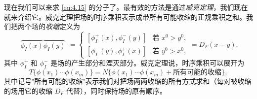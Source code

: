 现在我们可以来求 \eqref{eq:4.15} 的分子了。最有效的方法是通过\emph{威克定理}，我们现在就来介绍它。威克定理把场的时序乘积表示成带所有可能收缩的正规乘积之和。我们把两个场的\emph{收缩}定义为
\begin{equation}
  \begin{array}{c}
    \overbrace{\phi_I(x)\phi_I(y)}
  \end{array}
  = \begin{cases}
    [\phi_I^+(x), \phi_I^-(y)] & \text{若 } x^0 > y^0,\\
    [\phi_I^-(y), \phi_I^+(x)] & \text{若 } y^0 > x^0,
  \end{cases}
  = D_F(x-y) ,
  \label{eq:4.29}
\end{equation}
其中 $\phi_I^+$ 和 $\phi_I^-$ 是场的产生部分和湮灭部分。威克定理说，时序乘积可以展开为
\begin{equation}
  T\{\phi(x_1)\cdots\phi(x_m)\} = N\{
    \phi(x_1)\cdots\phi(x_m) + \text{所有可能的收缩} \},
  \label{eq:4.30}
\end{equation}
其中记号"所有可能的收缩"表示我们对把场两两收缩的所有方式求和（每对被收缩的场用它的收缩 $D_F$ 代替），同时保持场的原有顺序。

